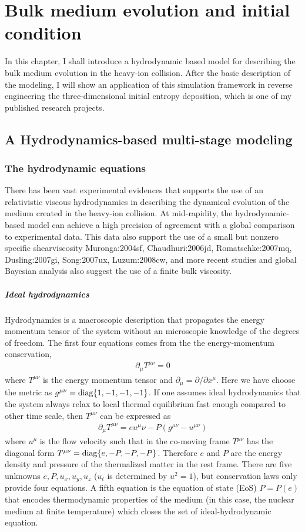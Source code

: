 \chapter{Bulk medium evolution and initial condition}
In this chapter, I shall introduce a hydrodynamic based model for describing the bulk medium evolution in the heavy-ion collision.
After the basic description of the modeling, I will show an application of this simulation framework in reverse engineering the three-dimensional initial entropy deposition, which is one of my published research projects.

\section{A Hydrodynamics-based multi-stage modeling}
\subsection{The hydrodynamic equations}
There has been vast experimental evidences that supports the use of an relativistic viscous hydrodynamics in describing the dynamical evolution of the medium created in the heavy-ion collision.
At mid-rapidity, the hydrodynamic-based model can achieve a high precision of agreement with a global comparison to experimental data. 
This data also support the use of a small but nonzero specific shearviscosity {Muronga:2004sf, Chaudhuri:2006jd, Romatschke:2007mq, Dusling:2007gi, Song:2007ux, Luzum:2008cw}, and more recent studies and global Bayesian analysis also suggest the use of a finite bulk viscosity.

\paragraph{Ideal hydrodynamics} Hydrodynamics is a macroscopic description that propagates the energy momentum tensor of the system without an microscopic knowledge of the degrees of freedom.
The first four equations comes from the the energy-momentum conservation,
\begin{eqnarray}
\partial_\mu T^{\mu\nu} = 0
\end{eqnarray}
where $T^{\mu\nu}$ is the energy momentum tensor and $\partial_\mu = \partial/\partial x^\mu$. 
Here we have choose the metric as $g^{\mu\nu} = \operatorname{diag}\{1, -1, -1, -1\}$.
If one assumes ideal hydrodynamics that the system always relax to local thermal equilibrium fast enough compared to other time scale, then $T^{\mu\nu}$ can be expressed as
\begin{eqnarray}
\partial_\mu T^{\mu\nu} = e u^\mu \nu - P (g^{\mu\nu}-u^{\mu\nu})
\end{eqnarray}
where $u^\mu$ is the flow velocity such that in the co-moving frame  $T^{\mu\nu}$ has the diagonal form $T^{\mu\nu} = \operatorname{diag}\{e, -P, -P, -P\}$.
Therefore $e$ and $P$ are the energy density and pressure of the thermalized matter in the rest frame.
There are five unknowns $e, P, u_x, u_y, u_z$ ($u_t$ is determined by $u^2 = 1$), but conservation laws only provide four equations.
A fifth equation is the equation of state (EoS) $P = P(e)$ that encodes thermodynamic properties of the medium (in this case, the nuclear medium at finite temperature) which closes the set of ideal-hydrodynamic equation.
